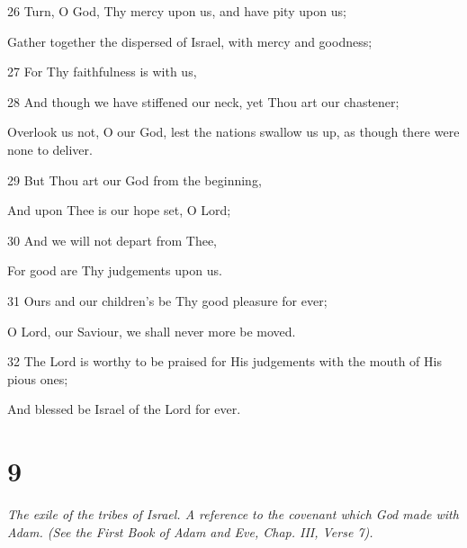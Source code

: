 \par    
\par 26 Turn, O God, Thy mercy upon us, and have pity upon us;
\par  Gather together the dispersed of Israel, with mercy and goodness;
\par 27 For Thy faithfulness is with us,
\par 28 And though we have stiffened our neck, yet Thou art our chastener;
\par  Overlook us not, O our God, lest the nations swallow us up, as though there were none to deliver.
\par    
\par 29 But Thou art our God from the beginning,
\par  And upon Thee is our hope set, O Lord;
\par 30 And we will not depart from Thee,
\par  For good are Thy judgements upon us.
\par 31 Ours and our children's be Thy good pleasure for ever;
\par  O Lord, our Saviour, we shall never more be moved.
\par 32 The Lord is worthy to be praised for His judgements with the mouth of His pious ones;
\par  And blessed be Israel of the Lord for ever.

\chapter{9}

\par \textit{The exile of the tribes of Israel. A reference to the covenant which God made with Adam. (See the First Book of Adam and Eve, Chap. III, Verse 7).}

